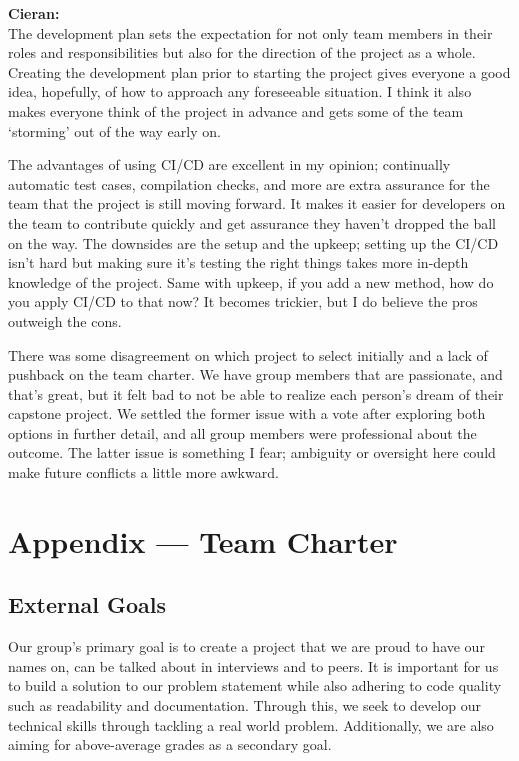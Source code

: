 \documentclass{article}
\begin{document}
\noindent \textbf{Cieran:}\\
The development plan sets the expectation for not only team members in their roles and responsibilities but also for the direction of the project as a whole. Creating the development plan prior to starting the project gives everyone a good idea, hopefully, of how to approach any foreseeable situation. I think it also makes everyone think of the project in advance and gets some of the team ‘storming’ out of the way early on.

The advantages of using CI/CD are excellent in my opinion; continually automatic test cases, compilation checks, and more are extra assurance for the team that the project is still moving forward. It makes it easier for developers on the team to contribute quickly and get assurance they haven’t dropped the ball on the way. The downsides are the setup and the upkeep; setting up the CI/CD isn’t hard but making sure it’s testing the right things takes more in-depth knowledge of the project. Same with upkeep, if you add a new method, how do you apply CI/CD to that now? It becomes trickier, but I do believe the pros outweigh the cons.

There was some disagreement on which project to select initially and a lack of pushback on the team charter. We have group members that are passionate, and that’s great, but it felt bad to not be able to realize each person’s dream of their capstone project. We settled the former issue with a vote after exploring both options in further detail, and all group members were professional about the outcome. The latter issue is something I fear; ambiguity or oversight here could make future conflicts a little more awkward.

\newpage{}

\section*{Appendix --- Team Charter}

\subsection*{External Goals}

Our group's primary goal is to create a project that we are proud to have our names
on, can be talked about in interviews and to peers. It is important for us to build 
a solution to our problem statement while also adhering to code quality such as 
readability and documentation. Through this, we seek to develop our technical skills 
through tackling a real world problem. Additionally, we are also aiming for above-average 
grades as a secondary goal. 
\end{document}

